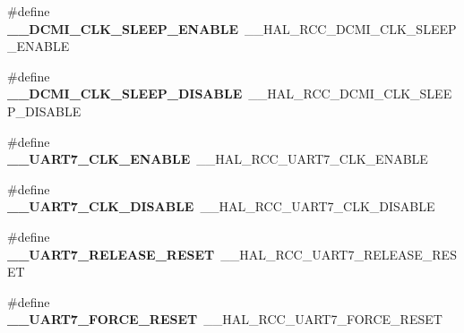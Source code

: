 \begin{DoxyCompactItemize}
\item 
\hypertarget{group___h_a_l___r_c_c___aliased_gaecedc3114ebbd77adfa55b4bbc2d8b57}{\#define {\bfseries \-\_\-\-\_\-\-D\-C\-M\-I\-\_\-\-C\-L\-K\-\_\-\-S\-L\-E\-E\-P\-\_\-\-E\-N\-A\-B\-L\-E}~\-\_\-\-\_\-\-H\-A\-L\-\_\-\-R\-C\-C\-\_\-\-D\-C\-M\-I\-\_\-\-C\-L\-K\-\_\-\-S\-L\-E\-E\-P\-\_\-\-E\-N\-A\-B\-L\-E}\label{group___h_a_l___r_c_c___aliased_gaecedc3114ebbd77adfa55b4bbc2d8b57}

\item 
\hypertarget{group___h_a_l___r_c_c___aliased_gac8a3efddee5662625e8e6600dd1ecbee}{\#define {\bfseries \-\_\-\-\_\-\-D\-C\-M\-I\-\_\-\-C\-L\-K\-\_\-\-S\-L\-E\-E\-P\-\_\-\-D\-I\-S\-A\-B\-L\-E}~\-\_\-\-\_\-\-H\-A\-L\-\_\-\-R\-C\-C\-\_\-\-D\-C\-M\-I\-\_\-\-C\-L\-K\-\_\-\-S\-L\-E\-E\-P\-\_\-\-D\-I\-S\-A\-B\-L\-E}\label{group___h_a_l___r_c_c___aliased_gac8a3efddee5662625e8e6600dd1ecbee}

\item 
\hypertarget{group___h_a_l___r_c_c___aliased_ga7bb431add3abe23b0fdc920d818b478a}{\#define {\bfseries \-\_\-\-\_\-\-U\-A\-R\-T7\-\_\-\-C\-L\-K\-\_\-\-E\-N\-A\-B\-L\-E}~\-\_\-\-\_\-\-H\-A\-L\-\_\-\-R\-C\-C\-\_\-\-U\-A\-R\-T7\-\_\-\-C\-L\-K\-\_\-\-E\-N\-A\-B\-L\-E}\label{group___h_a_l___r_c_c___aliased_ga7bb431add3abe23b0fdc920d818b478a}

\item 
\hypertarget{group___h_a_l___r_c_c___aliased_gac296bb1fe20a4be61a6572c11021d61d}{\#define {\bfseries \-\_\-\-\_\-\-U\-A\-R\-T7\-\_\-\-C\-L\-K\-\_\-\-D\-I\-S\-A\-B\-L\-E}~\-\_\-\-\_\-\-H\-A\-L\-\_\-\-R\-C\-C\-\_\-\-U\-A\-R\-T7\-\_\-\-C\-L\-K\-\_\-\-D\-I\-S\-A\-B\-L\-E}\label{group___h_a_l___r_c_c___aliased_gac296bb1fe20a4be61a6572c11021d61d}

\item 
\hypertarget{group___h_a_l___r_c_c___aliased_ga5ba5a490c4e274abe50505d7458ee505}{\#define {\bfseries \-\_\-\-\_\-\-U\-A\-R\-T7\-\_\-\-R\-E\-L\-E\-A\-S\-E\-\_\-\-R\-E\-S\-E\-T}~\-\_\-\-\_\-\-H\-A\-L\-\_\-\-R\-C\-C\-\_\-\-U\-A\-R\-T7\-\_\-\-R\-E\-L\-E\-A\-S\-E\-\_\-\-R\-E\-S\-E\-T}\label{group___h_a_l___r_c_c___aliased_ga5ba5a490c4e274abe50505d7458ee505}

\item 
\hypertarget{group___h_a_l___r_c_c___aliased_gaaf86ef9f6097817a19c83e97285857ba}{\#define {\bfseries \-\_\-\-\_\-\-U\-A\-R\-T7\-\_\-\-F\-O\-R\-C\-E\-\_\-\-R\-E\-S\-E\-T}~\-\_\-\-\_\-\-H\-A\-L\-\_\-\-R\-C\-C\-\_\-\-U\-A\-R\-T7\-\_\-\-F\-O\-R\-C\-E\-\_\-\-R\-E\-S\-E\-T}\label{group___h_a_l___r_c_c___aliased_gaaf86ef9f6097817a19c83e97285857ba}


\end{DoxyCompactItemize}
